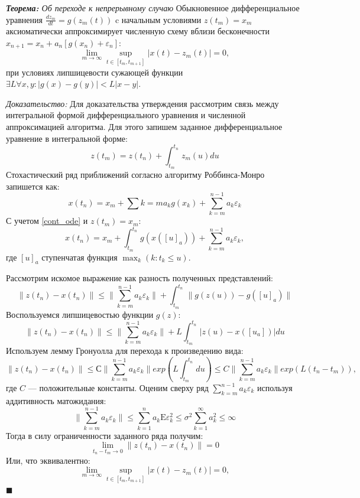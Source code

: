 \textit{\textbf{Теорема:} Об переходе к непрерывному случаю} Обыкновенное дифференциальное уравнения $\frac{d z_m}{d t} = g(z_m(t))$ c начальным условиями $z(t_m )=x_m$ аксиоматически аппроксимирует
численную схему вблизи бесконечности $x_{n+1} = x_n + a_n \left[g(x_n) + \varepsilon_n \right]$:
$$
    \lim_{m \rightarrow \infty} \sup_{t \in [t_m, t_{m+1} ] } |x(t) - z_m(t)|=0, 
$$
при условиях липшицевости сужающей функции  $\exists L \forall x,y: |g(x) - g(y)| < L |x-y|$.

\textit{Доказательство:} Для доказательства утверждения рассмотрим связь между интегральной формой дифференциального уравнения и численной
аппроксимацией алгоритма. Для этого запишем заданное дифференциальное уравнение в интегральной форме:
\begin{equation}
    z(t_m) = z(t_n) + \int_{t_m}^{t_n} z_m(u)du
    \label{cont_ode}
\end{equation}
Стохастический ряд приближений согласно алгоритму Роббинса-Монро запишется как:
\begin{equation}
    x(t_n) = x_m + \sum{k=m} a_k g(x_k) + \sum_{k=m}^{n-1} a_k \varepsilon_k 
\end{equation}
С учетом \ref{cont_ode} и  $z(t_m)=x_m$:
\begin{equation}
    x(t_n) = x_m + \int_{t_m}^{t_n} g(x([u]_a)) + \sum_{k=m}^{n-1} a_k \varepsilon_k, 
\end{equation}
где $[u]_a$ ступенчатая функция $\max_k(k: t_k \le u)$. 

Рассмотрим искомое выражение как разность полученных представлений:
\begin{equation}
    \| z(t_n) - x(t_n) \| \le \|\sum_{k=m}^{n-1} a_k \varepsilon_k \|+ \int_{t_m}^{t_n} \|g(z(u)) - g([u]_a)\|
\end{equation}
Воспользуемся липшицевостью функции $g(z)$:
\begin{equation}
    \| z(t_n) - x(t_n) \| \le  \|\sum_{k=m}^{n-1} a_k \varepsilon_k \| + L \int_{t_m}^{t_n} |z(u) - x([u_a])|du 
\end{equation}
Используем лемму Гронуолла для перехода к произведению вида:
\begin{equation}
    \| z(t_n) - x(t_n) \| \le  С \|\sum_{k=m}^{n-1} a_k \varepsilon_k \| exp(L \int_{t_m}^{t_n} du) \le C \|\sum_{k=m}^{n-1} a_k \varepsilon_k \| exp(L (t_n -t_m)),
\end{equation}
где $C$ --- положительные константы.
Оценим сверху ряд $\sum_{k=m}^{n-1} a_k \varepsilon_k$ используя аддитивность матожидания:
\begin{equation}
    \| \sum_{k=m}^{n-1} a_k \varepsilon_k \| \le \sum_{k=1}^n a_k \mathrm{E} \varepsilon_k^2 \le \sigma^2 \sum^\infty_{k=1} a_k^2 \le \infty  
\end{equation}
Тогда в силу ограниченности заданного ряда получим:
\begin{equation}
    \lim_{t_n - t_m \rightarrow 0} \| z(t_n) - x(t_n) \|  = 0 
\end{equation}
Или, что эквивалентно:
\begin{equation}
    \lim_{m \rightarrow \infty} \sup_{t \in [t_m, t_{m+1} ] } |x(t) - z_m(t)|=0, 
\end{equation}
$\blacksquare$

